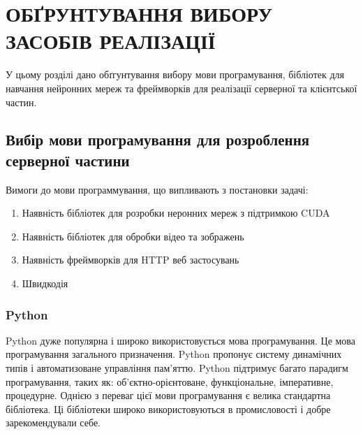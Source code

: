 
\chapter{ОБҐРУНТУВАННЯ ВИБОРУ ЗАСОБІВ РЕАЛІЗАЦІЇ}

У цьому розділі дано обґгунтування вибору мови програмування, бібліотек для навчання нейронних мереж та фреймворків для реалізації серверної та клієнтської частин. 

\section{Вибір мови програмування для розроблення серверної частини}
Вимоги до мови программування, що випливають з постановки задачі:

\begin{enumerate}
    \item Наявність бібліотек для розробки неронних мереж з підтримкою CUDA
    \item Наявність бібліотек для обробки відео та зображень
    \item Наявність фреймворків для HTTP веб застосувань
    \item Швидкодія
\end{enumerate}


\subsection{Python}

Python дуже популярна і широко використовується мова програмування. Це мова програмування загального призначення. Python пропонує систему динамічних типів і автоматизоване управління пам'яттю. Python підтримує багато парадигм програмування, таких як: об'єктно-орієнтоване, функціональне, імперативне, процедурне. Однією з переваг цієї мови програмування є велика стандартна бібліотека. Ці бібліотеки широко використовуються в промисловості і добре зарекомендували себе.

